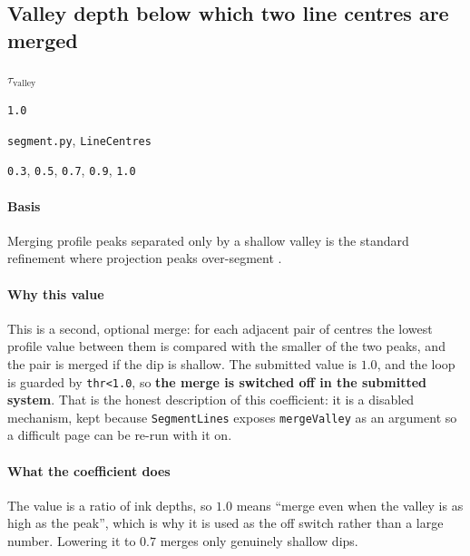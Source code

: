 \subsection{Valley depth below which two line centres are merged}

\label{coef:line-merge-valley}

\begin{description}[leftmargin=5.2em,style=sameline]

\item[Symbol] $\tau_{\text{valley}}$

\item[Value] \texttt{1.0}

\item[Source] \texttt{segment.py}, \texttt{LineCentres}

\item[Swept] \texttt{0.3}, \texttt{0.5}, \texttt{0.7}, \texttt{0.9}, \texttt{1.0}

\end{description}

\paragraph{Basis}

Merging profile peaks separated only by a shallow valley is the standard refinement where projection peaks over-segment \cite{likforman2007}.

\paragraph{Why this value}

This is a second, optional merge: for each adjacent pair of centres the lowest profile value between them is compared with the smaller of the two peaks, and the pair is merged if the dip is shallow. The submitted value is $1.0$, and the loop is guarded by \texttt{thr<1.0}, so \textbf{the merge is switched off in the submitted system}. That is the honest description of this coefficient: it is a disabled mechanism, kept because \texttt{SegmentLines} exposes \texttt{mergeValley} as an argument so a difficult page can be re-run with it on.

\paragraph{What the coefficient does}

The value is a ratio of ink depths, so $1.0$ means \enquote{merge even when the valley is as high as the peak}, which is why it is used as the off switch rather than a large number. Lowering it to $0.7$ merges only genuinely shallow dips.

